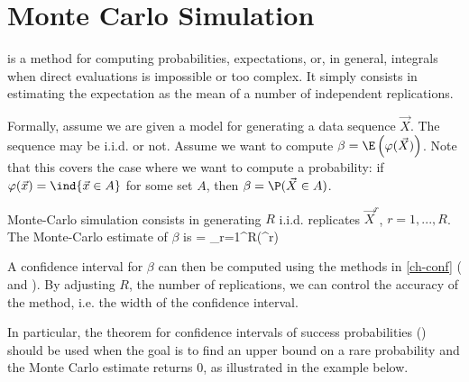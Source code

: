 \section{Monte Carlo Simulation}
  is a method for computing probabilities, expectations, or, in general, integrals
 when direct evaluations is impossible or too complex. It simply consists in estimating the expectation as the mean
 of a number of independent replications.

Formally, assume we are given a model for generating a data
sequence $\vec{X}$. The sequence may be i.i.d. or not. Assume
we want to compute
 $\beta=\E\left(\varphi(\vec{X})\right)$.  Note that this covers the case
 where we want to compute a probability: if $\varphi(\vec{x})=\ind{\vec{x}\in A}$ for some set
 $A$, then $\beta=\P(\vec{X} \in A)$.

Monte-Carlo simulation consists in generating $R$ i.i.d.
replicates $\vec{X}^r$, $r=1,...,R$. The Monte-Carlo estimate
of $\beta$ is
 \be
 \hat{\beta} = \sum_{r=1}^R\varphi(^r)
 \ee

A confidence interval for $\beta$ can then be computed using
the methods in \cref{ch-conf} ( and
). By adjusting $R$, the number of
replications, we can control the accuracy of the
 method, i.e. the width of the confidence interval.

In particular, the theorem for confidence intervals of success
probabilities () should be used when the
goal is to find an upper bound on a rare probability and the
Monte Carlo estimate returns $0$, as illustrated in the example
below.

